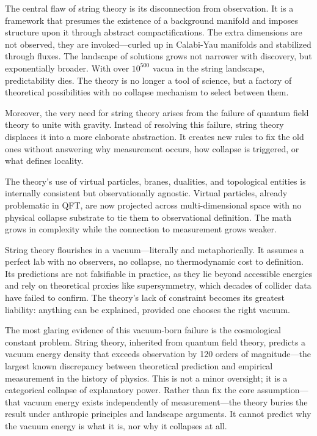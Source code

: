The central flaw of string theory is its disconnection from observation. It is a framework that presumes the existence of a background manifold and imposes structure upon it through abstract compactifications. The extra dimensions are not observed, they are invoked—curled up in Calabi-Yau manifolds and stabilized through fluxes. The landscape of solutions grows not narrower with discovery, but exponentially broader. With over \(10^{500}\) vacua in the string landscape, predictability dies. The theory is no longer a tool of science, but a factory of theoretical possibilities with no collapse mechanism to select between them.

Moreover, the very need for string theory arises from the failure of quantum field theory to unite with gravity. Instead of resolving this failure, string theory displaces it into a more elaborate abstraction. It creates new rules to fix the old ones without answering why measurement occurs, how collapse is triggered, or what defines locality.

The theory’s use of virtual particles, branes, dualities, and topological entities is internally consistent but observationally agnostic. Virtual particles, already problematic in QFT, are now projected across multi-dimensional space with no physical collapse substrate to tie them to observational definition. The math grows in complexity while the connection to measurement grows weaker.

String theory flourishes in a vacuum—literally and metaphorically. It assumes a perfect lab with no observers, no collapse, no thermodynamic cost to definition. Its predictions are not falsifiable in practice, as they lie beyond accessible energies and rely on theoretical proxies like supersymmetry, which decades of collider data have failed to confirm. The theory’s lack of constraint becomes its greatest liability: anything can be explained, provided one chooses the right vacuum.

The most glaring evidence of this vacuum-born failure is the cosmological constant problem. String theory, inherited from quantum field theory, predicts a vacuum energy density that exceeds observation by 120 orders of magnitude—the largest known discrepancy between theoretical prediction and empirical measurement in the history of physics. This is not a minor oversight; it is a categorical collapse of explanatory power. Rather than fix the core assumption—that vacuum energy exists independently of measurement—the theory buries the result under anthropic principles and landscape arguments. It cannot predict why the vacuum energy is what it is, nor why it collapses at all.

